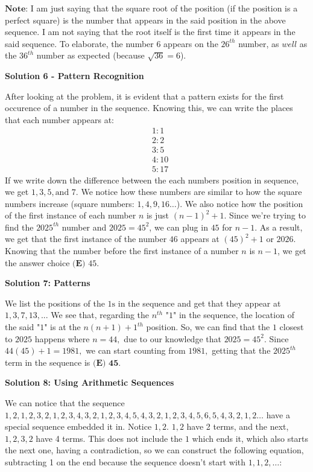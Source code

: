 \begin{enumerate}
 \(\textbf{Note}\): I am just saying that the square root of the position (if the position is a perfect square) is the number that appears in the said position in the above sequence. I am not saying that the root itself is the first time it appears in the said sequence. To elaborate, the number \(6\) appears on the \(26^{th}\) number, as \(\textit{well}\) as the \(36^{th}\) number as expected (because \(\sqrt{36} = 6\)).

 



\textbf{Solution 6 - Pattern Recognition}

After looking at the problem, it is evident that a pattern exists for the first occurence of a number in the sequence. Knowing this, we can write the places that each number appears at: \begin{align}&1: 1 \\&2: 2 \\&3: 5 \\&4: 10 \\&5: 17 \end{align}If we write down the difference between the each numbers position in sequence, we get $1, 3, 5, \text{and } 7$. We notice how these numbers are similar to how the square numbers increase (square numbers: $1, 4, 9, 16\ldots$). We also notice how the position of the first instance of each number $n$ is just $(n-1)^2+1$. Since we're trying to find the $2025^{th}$ number and $2025 = 45^2$, we can plug in $45$ for $n-1$. As a result, we get that the first instance of the number $46$ appears at $(45)^2+1$ or $2026$. Knowing that the number before the first instance of a number $n$ is $n-1$, we get the answer choice $\boxed{\textbf{(E) }45}.$




\textbf{Solution 7: Patterns}

We list the positions of the $\text{1s}$ in the sequence and get that they appear at $1,3,7,13,...$ We see that, regarding the $n^{th}$ "$1$" in the sequence, the location of the said "$1$" is at the $n(n+1)+1^{th}$ position. So, we can find that the $1$ closest to $2025$ happens where $n=44,$ due to our knowledge that $2025=45^2.$ Since $44(45)+1=1981,$ we can start counting from $1981,$ getting that the $2025^{th}$ term in the sequence is $\boxed{\textbf{(E) 45}}.$




\textbf{Solution 8: Using Arithmetic Sequences}

We can notice that the sequence $1, 2, 1, 2, 3, 2, 1, 2, 3, 4, 3, 2, 1, 2, 3, 4, 5, 4, 3, 2, 1, 2, 3, 4, 5, 6, 5, 4, 3, 2, 1, 2 \dots$ have a special sequence embedded it in. Notice $1, 2$. $1, 2$ have 2 terms, and the next, $1, 2, 3, 2$ have 4 terms. This does not include the $1$ which ends it, which also starts the next one, having a contradiction, so we can construct the following equation, subtracting 1 on the end because the sequence doesn't start with $1, 1, 2, \dots$:


\end{enumerate}
